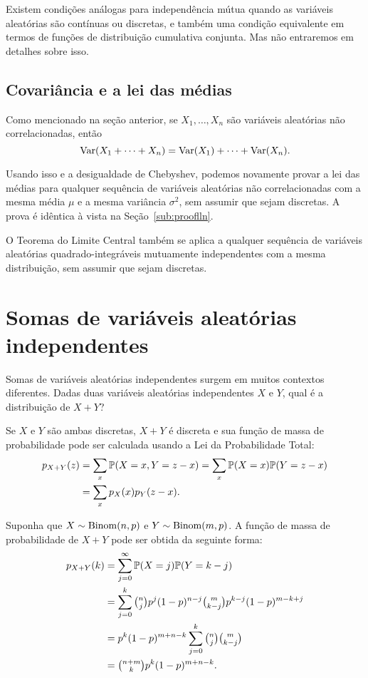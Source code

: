 Existem condições análogas para independência mútua quando as variáveis aleatórias são contínuas ou discretas, e também uma condição equivalente em termos de funções de distribuição cumulativa conjunta.
Mas não entraremos em detalhes sobre isso.

\subsection{Covariância e a lei das médias}

Como mencionado na seção anterior, se $ X_1,\dots,X_n $ são variáveis aleatórias não correlacionadas, então
\[
\mathrm{Var}(X_1+\dots+X_n)
=
\mathrm{Var}(X_1)
+\dots+
\mathrm{Var}(X_n)
.
\]

Usando isso e a desigualdade de Chebyshev, podemos novamente provar a lei das médias para qualquer sequência de variáveis aleatórias não correlacionadas com a mesma média $ \mu $ e a mesma variância $ \sigma^2 $, sem assumir que sejam discretas.
A prova é idêntica à vista na Seção~\ref{sub:prooflln}.

O Teorema do Limite Central também se aplica a qualquer sequência de variáveis aleatórias quadrado-integráveis mutuamente independentes com a mesma distribuição, sem assumir que sejam discretas.

\clearpage
\section{Somas de variáveis aleatórias independentes}

Somas de variáveis aleatórias independentes surgem em muitos contextos diferentes.
Dadas duas variáveis aleatórias independentes $ X $ e $ Y $, qual é a distribuição de $ X+Y $?

Se $ X $ e $ Y $ são ambas discretas, $ X+Y $ é discreta e sua função de massa de probabilidade pode ser calculada usando a Lei da Probabilidade Total:
\begin{align}
p_{X+Y}(z)&=\sum_{x}\mathbb{P}(X=x,Y=z-x)=\sum_{x}\mathbb{P}(X=x)\mathbb{P}(Y=z-x) \\
&= \sum_{x}p_{X}(x)p_{Y}(z-x).
\end{align}

\begin{example}
\label{exem:somaBernoulli}
Suponha que $X\sim \mathrm{Binom}(n,p)$ e $Y\sim \mathrm{Binom}(m,p)$.
A função de massa de probabilidade de $ X+Y $ pode ser obtida da seguinte forma:
\begin{align}
p_{X+Y}(k)&=\sum_{j=0}^\infty\mathbb{P}(X=j)\mathbb{P}(Y=k-j) \\
&= \sum_{j=0}^k \tbinom{n}{j}p^j(1-p)^{n-j}\tbinom{m}{k-j}p^{k-j}(1-p)^{m-k+j} \\
&= p^{k}(1-p)^{m+n-k}\sum_{j=0}^k \tbinom{n}{j}\tbinom{m}{k-j} \\
&= \tbinom{n+m}{k}p^{k}(1-p)^{m+n-k}.
\end{align}
\end{example}

